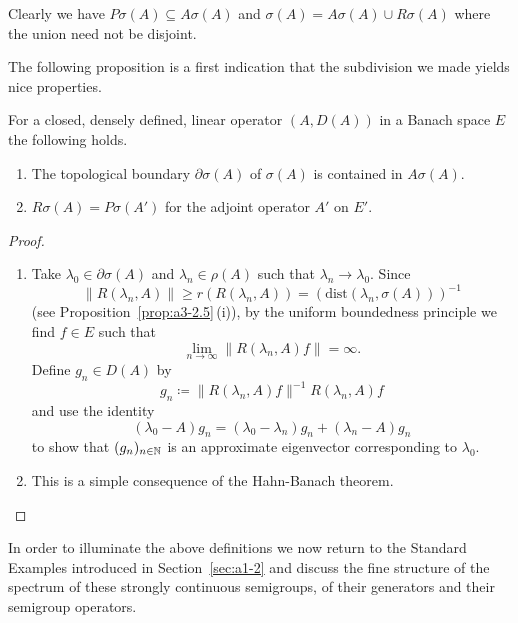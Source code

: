 Clearly we have $P\sigma(A) \subseteq A\sigma(A)$ and $\sigma(A) = A\sigma(A) \cup R\sigma(A)$ where the union need not be disjoint.

The following proposition is a first indication that the subdivision we made yields nice properties.
\begin{proposition}\label{prop:a3-2.2}
For a closed, densely defined, linear operator $(A,D(A))$ in a Banach space $E$ the following holds.
\begin{enumerate}[\upshape (i)]

\item
The topological boundary $\partial\sigma(A)$ of\/ $\sigma(A)$ is contained in $A\sigma(A)$.

\item
{}
$R\sigma(A) = P\sigma(A')$ for the adjoint operator $A'$ on $E'$.

\end{enumerate}
\end{proposition}
\begin{proof}
\begin{enumerate}[\upshape (i), wide, labelindent=.25em]

\item 
Take $\lambda_{0} \in \partial\sigma(A)$ and $\lambda_{n} \in \rho(A)$ such that $\lambda_{n} \to \lambda_{0}$.
Since 
%
\[
	 \|R(\lambda_{n},A)\| \geq r(R(\lambda_{n},A)) = (\mathrm{dist}(\lambda_{n},\sigma(A)))^{-1} 
\]
%
(see Proposition~\ref{prop:a3-2.5}\,(i)), by the uniform boundedness principle we find $f \in E$ such that
\[
	\lim_{n \to \infty}\|R(\lambda_n ,A)f\| = \infty .
\]
Define $g_{n} \in D(A)$ by
\[
g_{n} \coloneq \|R(\lambda_{n},A)f\|^{-1} R(\lambda_{n},A)f
\]
and use the identity
\[
	(\lambda_{0} - A)g_{n} = (\lambda_{0} - \lambda_{n})g_{n} + (\lambda_{n} - A)g_{n}
\]
to show that $(g_{n})_{n \in \mathbb{N}}$ is an approximate eigenvector corresponding to $\lambda_{0}$.

\item 
This is a simple consequence of the Hahn-Banach theorem.
\qedhere
\end{enumerate}
\end{proof}
In order to illuminate the above definitions we now return to the Standard Examples introduced in Section~\ref{sec:a1-2} and discuss the fine structure of the spectrum of these strongly continuous semigroups, \ie of their generators and their semigroup operators.
